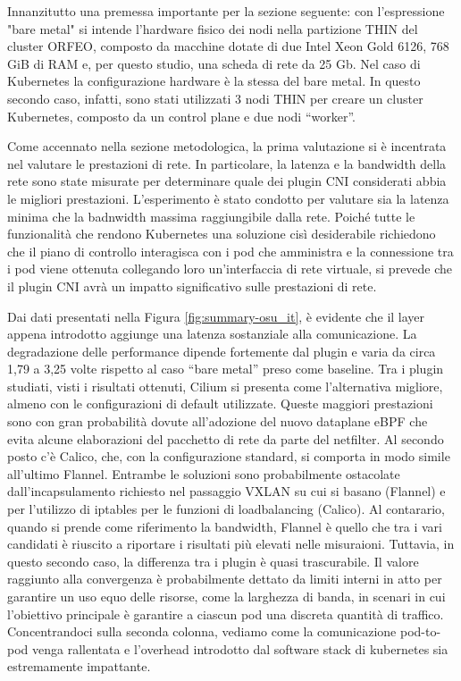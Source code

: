 Innanzitutto una premessa importante per la sezione seguente: con l'espressione
"bare metal" si intende l'hardware fisico dei nodi nella partizione THIN del
cluster ORFEO, composto da macchine dotate di due Intel Xeon Gold 6126, 768 GiB
di RAM e, per questo studio, una scheda di rete da 25 Gb. Nel caso di Kubernetes
la configurazione hardware è la stessa del bare metal.
In questo secondo caso, infatti, sono stati utilizzati 3 nodi THIN per creare un
cluster Kubernetes, composto da un control plane e due nodi ``worker''.

Come accennato nella sezione metodologica, la prima valutazione si è incentrata
nel valutare le prestazioni di rete.
In particolare, la latenza e la bandwidth della rete sono state misurate per
determinare quale dei plugin CNI considerati abbia le migliori prestazioni.
L'esperimento è stato condotto per valutare sia la latenza minima che la
badnwidth massima raggiungibile dalla rete.
Poiché tutte le funzionalità che rendono Kubernetes una soluzione cisì
desiderabile richiedono che il piano di controllo interagisca con i pod che
amministra e la connessione tra i pod viene ottenuta collegando loro
un'interfaccia di rete virtuale, si prevede che il plugin CNI avrà un impatto
significativo sulle prestazioni di rete.

Dai dati presentati nella Figura \ref{fig:summary-osu_it}, è evidente che il
layer appena introdotto aggiunge una latenza sostanziale alla comunicazione.
La degradazione delle performance dipende fortemente dal plugin e varia da circa
1,79 a 3,25 volte rispetto al caso ``bare metal'' preso come baseline.
Tra i plugin studiati, visti i risultati ottenuti, Cilium si presenta come
l'alternativa migliore, almeno con le configurazioni di default utilizzate.
Queste maggiori prestazioni sono con gran probabilità dovute all'adozione del
nuovo dataplane eBPF che evita alcune elaborazioni del pacchetto di rete da
parte del netfilter.
 Al secondo posto c'è Calico, che, con la configurazione standard,
si comporta in modo simile all'ultimo Flannel.
Entrambe le soluzioni sono probabilmente ostacolate dall'incapsulamento richiesto nel
passaggio VXLAN su cui si basano (Flannel) e per l'utilizzo di iptables per le
funzioni di loadbalancing (Calico).
Al contarario, quando si prende come riferimento la bandwidth, Flannel è quello
che tra i vari candidati è riuscito a riportare i risultati più elevati nelle
misuraioni.
Tuttavia, in questo secondo caso, la differenza tra i plugin è
quasi trascurabile.
Il valore raggiunto alla convergenza è probabilmente dettato da
limiti interni in atto per garantire un uso equo delle risorse, come la
larghezza di banda, in scenari in cui l'obiettivo principale è garantire a
ciascun pod una discreta quantità di traffico.
Concentrandoci sulla seconda colonna, vediamo come la comunicazione pod-to-pod
venga rallentata e l'overhead introdotto dal software stack di kubernetes sia
estremamente impattante.

